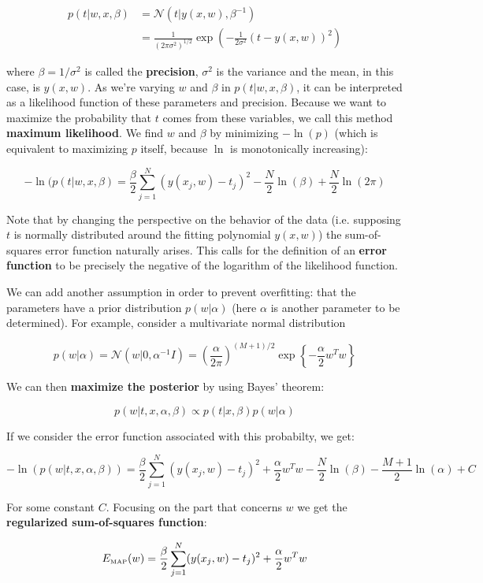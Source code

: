 \begin{align*}
	p(t|w, x, \beta) &= \mathcal{N}(t|y(x,w), \beta^{-1})\\
	&= \frac{1}{(2\pi\sigma^2)^{1/2}}\exp\left(-\frac{1}{2\sigma^2}(t-y(x,w))^2\right)
\end{align*}

where $\beta = 1/\sigma^2$ is called the \textbf{precision}, $\sigma^2$ is the variance and the mean, in this case, is $y(x,w)$. As we're varying $w$ and $\beta$ in $p(t|w,x,\beta)$, it can be interpreted as a likelihood function of these parameters and precision. Because we want to maximize the probability that $t$ comes from these variables, we call this method \textbf{maximum likelihood}. We find $w$ and $\beta$ by minimizing $-\ln(p)$ (which is equivalent to maximizing $p$ itself, because $\ln$ is monotonically increasing):

\[-\ln(p(t|w,x,\beta) = \frac{\beta}{2}\sum_{j=1}^N(y(x_j, w) - t_j)^2 - \frac{N}{2}\ln(\beta) + \frac{N}{2}\ln(2\pi) \]

Note that by changing the perspective on the behavior of the data (i.e. supposing $t$ is normally distributed around the fitting polynomial $y(x,w)$) the sum-of-squares error function naturally arises. This calls for the definition of an \textbf{error function} to be precisely the negative of the logarithm of the likelihood function.

We can add another assumption in order to prevent overfitting: that the parameters have a prior distribution $p(w|\alpha)$ (here $\alpha$ is another parameter to be determined). For example, consider a multivariate normal distribution

\[p(w|\alpha) = \mathcal{N}(w|0, \alpha^{-1}I) = \left(\frac{\alpha}{2\pi}\right)^{(M+1)/2}\exp\left\{-\frac{\alpha}{2}w^Tw\right\}\]

We can then \textbf{maximize the posterior} by using Bayes' theorem:

\[p(w|t, x, \alpha, \beta) \propto p(t|x,\beta)p(w|\alpha)\]

If we consider the error function associated with this probabilty, we get: 

\[-\ln(p(w|t,x,\alpha,\beta)) = \frac{\beta}{2}\sum_{j=1}^N(y(x_j, w) - t_j)^2 + \frac{\alpha}{2}w^Tw - \frac{N}{2}\ln(\beta) - \frac{M+1}{2}\ln(\alpha) + C\]

For some constant $C$. Focusing on the part that concerns $w$ we get the \textbf{regularized sum-of-squares function}:

\[E_{\tiny\mbox{MAP}}(w) = \frac{\beta}{2}\sum_{j=1}^N(y(x_j, w) - t_j)^2 + \frac{\alpha}{2}w^Tw\]

